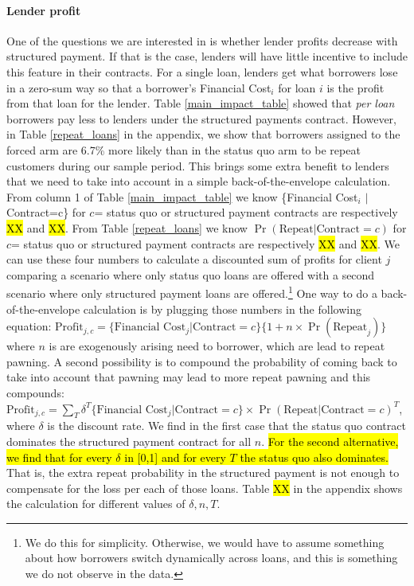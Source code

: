 \documentclass[12pt, a4paper]{article}
\begin{document}
\paragraph{Lender profit} One of the questions we are interested in is whether lender profits decrease with structured payment. If that is the case, lenders will have little incentive to include this feature in their contracts. For a single loan, lenders get what borrowers lose in a zero-sum way so that a borrower's Financial Cost$_i$ for loan $i$ is the profit from that loan for the lender. Table \ref{main_impact_table} showed that \textit{per loan} borrowers pay less to lenders under the structured payments contract. However, in Table \ref{repeat_loans} in the appendix, we show that borrowers assigned to the forced arm are 6.7\% more likely than in the status quo arm to be repeat customers during our sample period. This brings some extra benefit to lenders that we need to take into account in a simple back-of-the-envelope calculation. From column 1 of Table \ref{main_impact_table} we know \{Financial Cost$_i$ $|$ Contract=c\} for $c$= status quo or structured payment contracts are respectively \hl{XX} and \hl{XX}. From Table \ref{repeat_loans} we know $\Pr(\text{Repeat} | \text{Contract}=c)$ for $c$= status quo or structured payment contracts are respectively \hl{XX} and \hl{XX}. We can use these four numbers to calculate a discounted sum of profits for client $j$ comparing a scenario where only status quo loans are offered with a second scenario where only structured payment loans are offered.\footnote{We do this for simplicity. Otherwise, we would have to assume something about how borrowers switch dynamically across loans, and this is something we do not observe in the data.} One way to do a back-of-the-envelope calculation is by plugging those numbers in the following equation: 
 $\text{Profit}_{j,c} = \{\text{Financial Cost}_j | \text{Contract}=c\}\{1+n\times\Pr(\text{Repeat}_j)\}$ where $n$ is are exogenously arising need to borrower, which are lead to repeat pawning. A second possibility is to compound the probability of coming back to take into account that pawning may lead to more repeat pawning and this compounds: $\text{Profit}_{j,c}  = \sum_{T}\delta^T\{\text{Financial Cost}_j | \text{Contract}=c\}\times\Pr(\text{Repeat} | \text{Contract}=c)^T$, where $\delta$ is the discount rate. We find in the first case that the status quo contract dominates the structured payment contract for all $n$. \hl{For the second alternative, we find that for every  $\delta$ in [0,1] and for every $T$ the status quo also dominates.} That is, the extra repeat probability in the structured payment is not enough to compensate for the loss per each of those loans. Table \hl{XX} in the appendix shows the calculation for different values of $\delta, n, T$.
\end{document}
